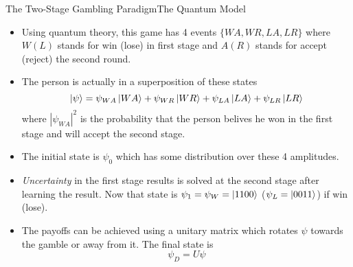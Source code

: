 \documentclass[aspectratio=169, handout]{beamer}
\newcommand{\qbit}{\ensuremath|\psi\rangle}
\theoremstyle{example}
\begin{document}
\begin{frame}{The Two-Stage Gambling Paradigm}{The Quantum Model}
  \begin{itemize}
  \pause\item Using quantum theory, this game has 4 events $\{WA, WR, LA, LR\}$ where $W (L)$ stands for win (lose) in first stage and $A (R)$ stands for accept (reject) the second round. 
  \pause\item The person is actually in a superposition of these states \[\qbit = \psi_{WA}\ket{WA} + \psi_{WR}\ket{WR} + \psi_{LA}\ket{LA} + \psi_{LR}\ket{LR}\] where $|\psi_{WA}|^2$ is the probability that the person belives he won in the first stage and will accept the second stage.
  \pause\item The initial state is $\psi_0$ which has some distribution over these 4 amplitudes.
  \pause\item \emph{Uncertainty} in the first stage results is solved at the second stage after learning the result. Now that state is $\psi_1 = \psi_W = \ket{1100}$ ($\psi_L = \ket{0011}$) if win (lose). 
  \pause\item The payoffs can be achieved using a unitary matrix which rotates $\psi$ towards the gamble or away from it. The final state is \[\psi_D = U\psi\]%
  \end{itemize}
\end{frame}
\end{document}
